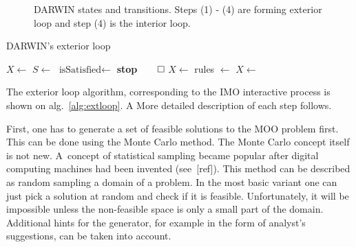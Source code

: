 \begin{figure}
\begin{center}
    \caption{DARWIN states and transitions. Steps (1) - (4) are forming
      exterior loop and step (4) is the interior loop.\label{fig:darwin-ext}}
  \end{center} 
\end{figure}

\begin{algorithm}
\caption{DARWIN's exterior loop}\label{alg:extloop}
  \begin{algorithmic}[1]
    \State $X \gets$  \label{algin:solgen}
    \State $S \gets$  \label{algin:scengen}
    \Loop
     \label{algin:evstart} 
    \State {} 
    \EndFor{} \label{algin:evstop}
    \State $\text{isSatisfied} \gets$  \label{algin:dmshow}
    \State \textbf{stop}$\qed$ 
    \Else
    \State $X \gets$  \label{algin:dmmark}
    \EndIf
    \State rules $\gets$  \label{algin:rules}
    \State $X \gets$   \label{algin:intloop}
    \EndLoop{}
  \end{algorithmic}
\end{algorithm}


The exterior loop algorithm, corresponding to the IMO interactive process is
shown on alg.~\ref{alg:extloop}. A More detailed description of each step
follows.

First, one has to generate a set of feasible solutions to the MOO problem
first. This can be done using the Monte Carlo method. The Monte Carlo concept
itself is not new. A~concept of statistical sampling became popular after
digital computing machines had been invented (see~[ref]). This method can be
described as random sampling a domain of a problem. In the most basic variant
one can just pick a solution at random and check if it is
feasible. Unfortunately, it will be impossible unless the non-feasible space
is only a small part of the domain. Additional hints for the generator, for
example in the form of analyst's suggestions, can be taken into account.

